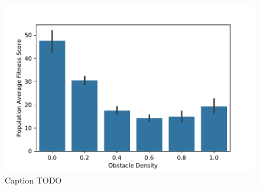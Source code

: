 \begin{figure}[!htbp]
\begin{center}
\includegraphics[width=\textwidth]{img/obstacle_density_average_fitness.pdf}
\caption{
Caption TODO
}
\label{fig:obstacle_density_average_fitness}
\end{center}
\end{figure}
